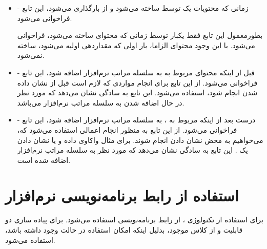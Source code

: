 \documentclass[oneside]{report}
\begin{document}
\begin{itemize}
	\item[ ]
	{\normalsize {}}-
	زمانی که محتویات یک 
	{\normalsize {}} 
	توسط 
	{\normalsize {}} 
	ساخته می‌شود و از 
	{\normalsize {}} 
	بارگذاری می‌شود، این تابع فراخوانی می‌شود. 
	
	بطورمعمول این تابع فقط یکبار توسط 
	{\normalsize {}} 
	زمانی که محتوای 
	{\normalsize {}} 
	ساخته می‌شود، فراخوانی می‌شود. با این وجود محتوای 
	{\normalsize {}}
	الزاما، بار اولی که 
	{\normalsize {}}
	مقداردهی اولیه می‌شود،   ساخته نمی‌شود. 
	
	\item[ ]
	{\normalsize {}}- 
	قبل از اینکه محتوای 
	{\normalsize {}}
	مربوط به 
	{\normalsize {}}
	به سلسله مراتب 
	{\normalsize {}}
	نرم‌افزار اضافه شود، این تابع فراخوانی می‌شود. از این تابع برای انجام مواردی که لازم است قبل از نشان داده شدن 
	{\normalsize {}}
	انجام شود، استفاده می‌شود. این تابع به سادگی نشان می‌دهد که 
	{\normalsize {}}
	مورد نظر در حال اضافه شدن به سلسله مراتب 
	{\normalsize {}}
	نرم‌افزار می‌باشد.
	
	\item[ ] 
	{\normalsize {}}- 
	درست بعد از اینکه 
	{\normalsize {}}
	مربوط به 
	{\normalsize {}}،
	به سلسله مراتب 
	{\normalsize {}}
	نرم‌افزار اضافه شود، این تابع فراخوانی می‌شود. از این تابع به منظور انجام اعمالی استفاده می‌شود که،  می‌خواهیم به محض نشان دادن 
	{\normalsize {}}
	انجام شوند. برای مثال واکاوی داده و یا نشان دادن یک 
		{\normalsize {}}
	. این تابع به سادگی نشان می‌دهد که 
	{\normalsize {}}
	مورد نظر به سلسله مراتب 
	{\normalsize {}}
	نرم‌افزار اضافه شده است.
	
\end{itemize}
	
\section{استفاده از رابط برنامه‌نویسی نرم‌افزار {\normalsize {}}}
	برای استفاده از تکنولوژی 
	{\normalsize {}}
	، از رابط برنامه‌نویسی 
	{\normalsize {}}
	استفاده می‌شود. برای پیاده سازی دو قابلیت 
		{\normalsize {}}
		و 
			{\normalsize {}}
			از کلاس 
				{\normalsize {}} 
				موجود، بدلیل اینکه امکان استفاده در حالت 
					{\normalsize {}}
				وجود داشته باشد، استفاده می‌شود.
\end{document}
